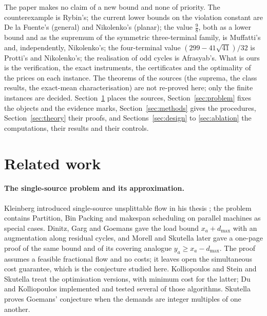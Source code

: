 \documentclass[11pt]{article}
\theoremstyle{remark}
\newcommand{\dmax}{d_{\max}}
\begin{document}
The paper makes no claim of a new bound and none of priority. The counterexample is Rybin's; the current lower
bounds on the violation constant are De la Fuente's (general) and Nikolenko's (planar); the value $\tfrac98$, both as a lower bound
and as the supremum of the symmetric three-terminal family, is Muffatti's and, independently, Nikolenko's; the four-terminal
value $(299-41\sqrt{41})/32$ is Protti's and Nikolenko's; the realisation of odd cycles is
Afrasyab's. What is ours is the verification, the exact instruments, the certificates and the optimality of the
prices on each instance. The theorems of the sources (the suprema, the class results, the
exact-mean characterisation) are not re-proved here; only the finite instances are decided. Section~\ref{sec:related}
places the sources, Section~\ref{sec:problem} fixes the objects and the evidence marks, Section~\ref{sec:methods}
gives the procedures, Section~\ref{sec:theory} their proofs, and Sections~\ref{sec:design} to \ref{sec:ablation}
the computations, their results and their controls.

\section{Related work}
\label{sec:related}

\paragraph{The single-source problem and its approximation.} Kleinberg introduced single-source unsplittable
flow in his thesis \cite{Kle96}; the problem contains Partition, Bin Packing and makespan scheduling on parallel
machines as special cases. Dinitz, Garg and Goemans \cite{DGG99} gave the load bound $x_a+\dmax$ with an
augmentation along residual cycles, and Morell and Skutella \cite{MS22} later gave a one-page proof of the same
bound and of its covering analogue $y_a\ge x_a-\dmax$. The proof assumes a feasible fractional flow and no costs;
it leaves open the simultaneous cost guarantee, which is the conjecture studied here. Kolliopoulos and Stein
\cite{KS02} and Skutella \cite{Sku02} treat the optimisation versions, with minimum cost for the latter; Du and
Kolliopoulos \cite{DK05} implemented and tested several of those algorithms. Skutella proves Goemans'
conjecture when the demands are integer multiples of one another.
\end{document}
